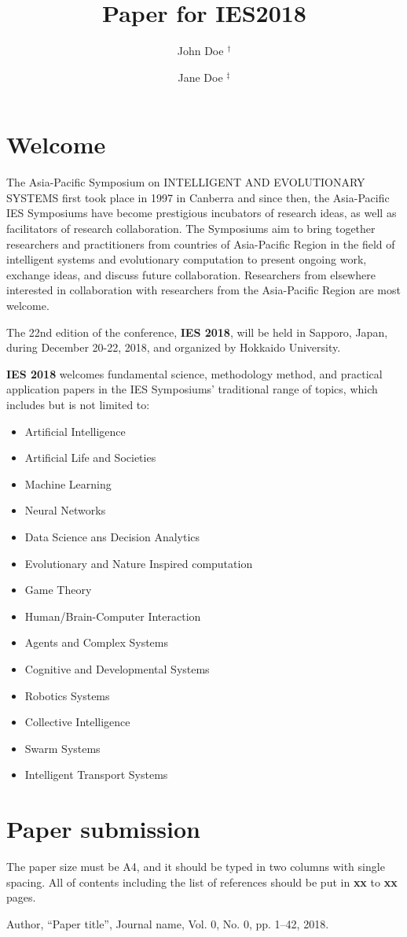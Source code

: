 \documentclass{ies2018}
\title{Paper for IES2018}
\author{John Doe $^{\dagger}$ \and Jane Doe $^{\ddagger}$}
\affiliation{%
    ${}^\dagger$ University/Company, City, Country\\
    ${}^\ddagger$ University/Company, City, Country
}
\begin{document}
\maketitle

\section{Welcome}
The Asia-Pacific Symposium on INTELLIGENT AND EVOLUTIONARY SYSTEMS first took place in 1997 in Canberra and since then, the Asia-Pacific IES Symposiums have become prestigious incubators of research ideas, as well as facilitators of research collaboration.
The Symposiums aim to bring together researchers and practitioners from countries of Asia-Pacific Region in the field of intelligent systems and evolutionary computation to present ongoing work, exchange ideas, and discuss future collaboration.
Researchers from elsewhere interested in collaboration with researchers from the Asia-Pacific Region are most welcome.

The 22nd edition of the conference, {\bf IES 2018}, will be held in Sapporo, Japan, during December 20-22, 2018, and organized by Hokkaido University.

{\bf IES 2018} welcomes fundamental science, methodology method, and practical application papers in the IES Symposiums' traditional range of topics, which includes but is not limited to:
\begin{itemize}
    \item Artificial Intelligence
    \item Artificial Life and Societies
    \item Machine Learning
    \item Neural Networks
    \item Data Science ans Decision Analytics
    \item Evolutionary and Nature Inspired computation
    \item Game Theory
    \item Human/Brain-Computer Interaction
    \item Agents and Complex Systems
    \item Cognitive and Developmental Systems
    \item Robotics Systems
    \item Collective Intelligence
    \item Swarm Systems
    \item Intelligent Transport Systems
\end{itemize}

\section{Paper submission}
The paper size must be A4, and it should be typed in two columns with single spacing.
All of contents including the list of references should be put in {\bf xx} to {\bf xx} pages.

\begin{thebibliography}{99}
        Author,
        ``Paper title'',
        Journal name,
        Vol. 0, No. 0, pp. 1--42, 2018.
\end{thebibliography}
\end{document}
